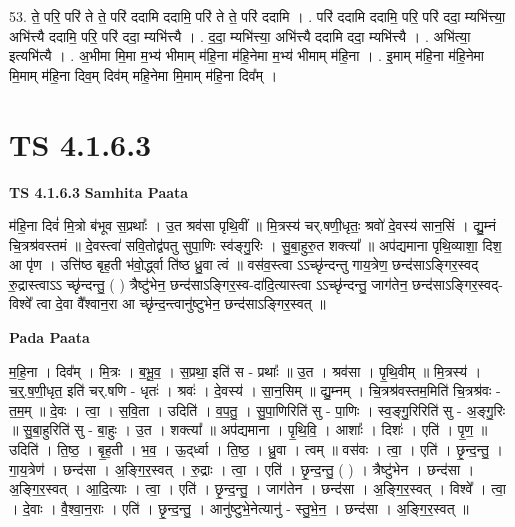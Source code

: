 \documentclass[17pt]{extarticle}
\begin{document}
53. ते॒ परि॒ परि॑ ते ते॒ परि॑ ददामि ददामि॒ परि॑ ते ते॒ परि॑ ददामि । . परि॑ ददामि ददामि॒ परि॒ परि॑ ददा॒ म्यभि॑त्त्या॒ अभि॑त्त्यै ददामि॒ परि॒ परि॑ ददा॒ म्यभि॑त्त्यै । . द॒दा॒ म्यभि॑त्त्या॒ अभि॑त्त्यै ददामि ददा॒ म्यभि॑त्त्यै । . अभि॑त्या॒ इत्यभि॑त्यै । . अ॒भीमा मि॒मा म॒भ्य॑ भीमाम् म॑हि॒ना म॑हि॒नेमा म॒भ्य॑ भीमाम् म॑हि॒ना । . इ॒माम् म॑हि॒ना म॑हि॒नेमा मि॒माम् म॑हि॒ना दिव॒म् दिव॑म् महि॒नेमा मि॒माम् म॑हि॒ना दिव᳚म् । \newline
\pagebreak
{}

\section{ TS 4.1.6.3 }

\textbf{TS 4.1.6.3 } \newline
\textbf{Samhita Paata} \newline

म॑हि॒ना दिवं॑ मि॒त्रो ब॑भूव स॒प्रथाः᳚ । उ॒त श्रव॑सा पृथि॒वीं ॥ मि॒त्रस्य॑ चर्.षणी॒धृतः॒ श्रवो॑ दे॒वस्य॑ सान॒सिं । द्यु॒म्नं चि॒त्रश्र॑वस्तमं ॥ दे॒वस्त्वा॑ सवि॒तोद्व॑पतु सुपा॒णिः स्व॑ङ्गु॒रिः । सु॒बा॒हुरु॒त शक्त्या᳚ ॥ अप॑द्यमाना पृथि॒व्याशा॒ दिश॒ आ पृ॑ण । उत्ति॑ष्ठ बृह॒ती भ॑वो॒र्द्ध्वा ति॑ष्ठ ध्रु॒वा त्वं ॥ वस॑व॒स्त्वा ऽऽच्छृ॑न्दन्तु गाय॒त्रेण॒ छन्द॑साऽङ्गिर॒स्वद् रु॒द्रास्त्वाऽऽ च्छृ॑न्दन्तु॒ ( ) त्रैष्टु॑भेन॒ छन्द॑साऽङ्गिर॒स्व-दा॑दि॒त्यास्त्वा ऽऽच्छृ॑न्दन्तु॒ जाग॑तेन॒ छन्द॑साऽङ्गिर॒स्वद्-विश्वे᳚ त्वा दे॒वा वै᳚श्वान॒रा आ च्छृ॑न्द॒न्त्वानु॑ष्टुभेन॒ छन्द॑साऽङ्गिर॒स्वत् ॥ \newline

\textbf{Pada Paata} \newline

म॒हि॒ना । दिव᳚म् । मि॒त्रः । ब॒भू॒व॒ । स॒प्रथा॒ इति॑ स - प्रथाः᳚ ॥ उ॒त । श्रव॑सा । पृ॒थि॒वीम् ॥ मि॒त्रस्य॑ । च॒र्॒.ष॒णी॒धृत॒ इति॑ चर्.षणि - धृतः॑ । श्रवः॑ । दे॒वस्य॑ । सा॒न॒सिम् ॥ द्यु॒म्नम् । चि॒त्रश्र॑वस्तम॒मिति॑ चि॒त्रश्र॑वः - त॒म॒म् ॥ दे॒वः । त्वा॒ । स॒वि॒ता । उदिति॑ । व॒प॒तु॒ । सु॒पा॒णिरिति॑ सु - पा॒णिः । स्व॒ङ्गु॒रिरिति॑ सु - अ॒ङ्गु॒रिः ॥ सु॒बा॒हुरिति॑ सु - बा॒हुः । उ॒त । शक्त्या᳚ ॥ अप॑द्यमाना । पृ॒थि॒वि॒ । आशाः᳚ । दिशः॑ । एति॑ । पृ॒ण॒ ॥ उदिति॑ । ति॒ष्ठ॒ । बृ॒ह॒ती । भ॒व॒ । ऊ॒द्‌र्ध्वा । ति॒ष्ठ॒ । ध्रु॒वा । त्वम् ॥ वस॑वः । त्वा॒ । एति॑ । छृ॒न्द॒न्तु॒ । गा॒य॒त्रेण॑ । छन्द॑सा । अ॒ङ्गि॒र॒स्वत् । रु॒द्राः । त्वा॒ । एति॑ । छृ॒न्द॒न्तु॒ ( ) । त्रैष्टु॑भेन । छन्द॑सा । अ॒ङ्गि॒र॒स्वत् । आ॒दि॒त्याः । त्वा॒ । एति॑ । छृ॒न्द॒न्तु॒ । जाग॑तेन । छन्द॑सा । अ॒ङ्गि॒र॒स्वत् । विश्वे᳚ । त्वा॒ । दे॒वाः । वै॒श्वा॒न॒राः । एति॑ । छृ॒न्द॒न्तु॒ । आनु॑ष्टुभे॒नेत्यानु॑ - स्तु॒भे॒न॒ । छन्द॑सा । अ॒ङ्गि॒र॒स्वत् ॥  \newline
\end{document}
